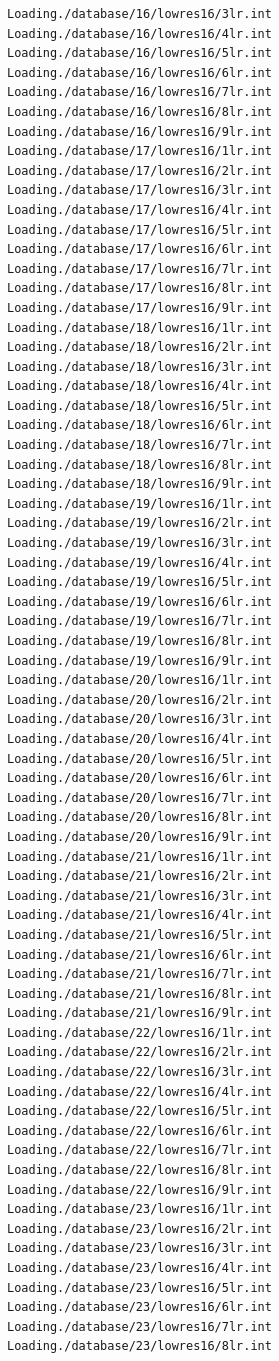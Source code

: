 \documentclass[a4paper,11pt,titlepage]{article}
\begin{document}
\begin{verbatim}
Loading./database/16/lowres16/3lr.int
Loading./database/16/lowres16/4lr.int
Loading./database/16/lowres16/5lr.int
Loading./database/16/lowres16/6lr.int
Loading./database/16/lowres16/7lr.int
Loading./database/16/lowres16/8lr.int
Loading./database/16/lowres16/9lr.int
Loading./database/17/lowres16/1lr.int
Loading./database/17/lowres16/2lr.int
Loading./database/17/lowres16/3lr.int
Loading./database/17/lowres16/4lr.int
Loading./database/17/lowres16/5lr.int
Loading./database/17/lowres16/6lr.int
Loading./database/17/lowres16/7lr.int
Loading./database/17/lowres16/8lr.int
Loading./database/17/lowres16/9lr.int
Loading./database/18/lowres16/1lr.int
Loading./database/18/lowres16/2lr.int
Loading./database/18/lowres16/3lr.int
Loading./database/18/lowres16/4lr.int
Loading./database/18/lowres16/5lr.int
Loading./database/18/lowres16/6lr.int
Loading./database/18/lowres16/7lr.int
Loading./database/18/lowres16/8lr.int
Loading./database/18/lowres16/9lr.int
Loading./database/19/lowres16/1lr.int
Loading./database/19/lowres16/2lr.int
Loading./database/19/lowres16/3lr.int
Loading./database/19/lowres16/4lr.int
Loading./database/19/lowres16/5lr.int
Loading./database/19/lowres16/6lr.int
Loading./database/19/lowres16/7lr.int
Loading./database/19/lowres16/8lr.int
Loading./database/19/lowres16/9lr.int
Loading./database/20/lowres16/1lr.int
Loading./database/20/lowres16/2lr.int
Loading./database/20/lowres16/3lr.int
Loading./database/20/lowres16/4lr.int
Loading./database/20/lowres16/5lr.int
Loading./database/20/lowres16/6lr.int
Loading./database/20/lowres16/7lr.int
Loading./database/20/lowres16/8lr.int
Loading./database/20/lowres16/9lr.int
Loading./database/21/lowres16/1lr.int
Loading./database/21/lowres16/2lr.int
Loading./database/21/lowres16/3lr.int
Loading./database/21/lowres16/4lr.int
Loading./database/21/lowres16/5lr.int
Loading./database/21/lowres16/6lr.int
Loading./database/21/lowres16/7lr.int
Loading./database/21/lowres16/8lr.int
Loading./database/21/lowres16/9lr.int
Loading./database/22/lowres16/1lr.int
Loading./database/22/lowres16/2lr.int
Loading./database/22/lowres16/3lr.int
Loading./database/22/lowres16/4lr.int
Loading./database/22/lowres16/5lr.int
Loading./database/22/lowres16/6lr.int
Loading./database/22/lowres16/7lr.int
Loading./database/22/lowres16/8lr.int
Loading./database/22/lowres16/9lr.int
Loading./database/23/lowres16/1lr.int
Loading./database/23/lowres16/2lr.int
Loading./database/23/lowres16/3lr.int
Loading./database/23/lowres16/4lr.int
Loading./database/23/lowres16/5lr.int
Loading./database/23/lowres16/6lr.int
Loading./database/23/lowres16/7lr.int
Loading./database/23/lowres16/8lr.int

\end{verbatim}
\end{document}
